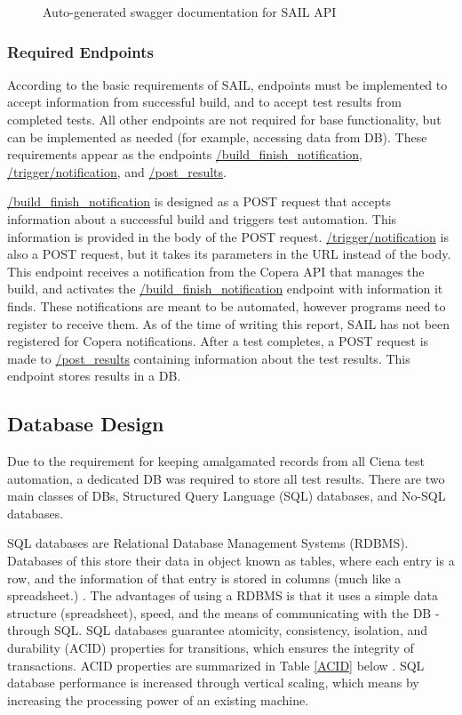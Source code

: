 \documentclass[10pt, titlepage, onecolumn, openany]{article}
\begin{document}
\begin{figure}[H]
\centering
{}
\caption{Auto-generated swagger documentation for SAIL API}
\label{swaggerDoc}
\end{figure}

\subsubsection{Required Endpoints}
According to the basic requirements of SAIL, endpoints must be
implemented to accept information from successful build, and to
accept test results from completed tests. All other endpoints
are not required for base functionality, but can be implemented as
needed (for example, accessing data from DB). These requirements
appear as the endpoints \url{/build_finish_notification},
\url{/trigger/notification}, and \url{/post_results}.

\url{/build_finish_notification} is designed as a POST request that
accepts information about a successful build and triggers test
automation. This information is provided in the body of the POST
request. \url{/trigger/notification} is also a POST request, but it
takes its parameters in the URL instead of the body. This endpoint
receives a notification from the Copera API that manages the build,
and activates the \url{/build_finish_notification} endpoint with
information it finds. These notifications are meant to be automated, however
programs need to register to receive them. As of the time of writing this
report, SAIL has not been registered for Copera notifications.
After a test completes, a POST request is made to \url{/post_results}
containing information about the test results. This endpoint stores results in a
DB.

\subsection{Database Design}
Due to the requirement for keeping amalgamated records from all Ciena test
automation, a dedicated DB was required to store all test results. There are two
main classes of DBs, Structured Query Language (SQL) databases, and No-SQL
databases.

SQL databases are Relational Database Management Systems (RDBMS). Databases
of this store their data in object known as tables, where each entry is a row,
and the information of that entry is stored in columns (much like a spreadsheet.)
\cite{rdbmsinfo}. The advantages of using a RDBMS is that it uses a simple data
structure (spreadsheet), speed, and the means of communicating with the DB - through
SQL. SQL databases guarantee atomicity, consistency, isolation, and durability (ACID)
properties for transitions, which ensures the integrity of transactions.
ACID properties are summarized in Table \ref{ACID} below \cite{aciddef}. SQL database performance
is increased through vertical scaling, which means by increasing the processing
power of an existing machine.
\end{document}
